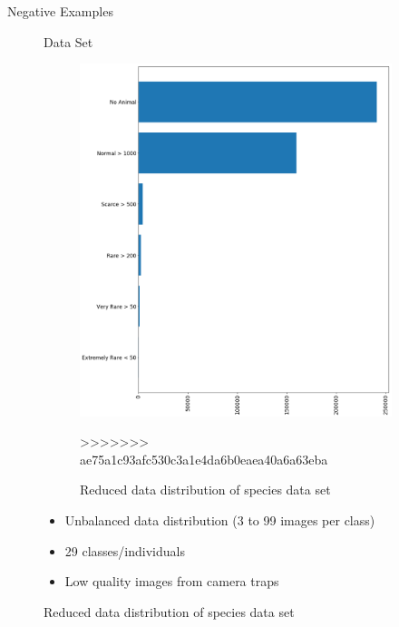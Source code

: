 \documentclass[10pt]{beamer}
\begin{document}
\begin{frame}{Negative Examples}
\begin{figure}
\begin{frame}{Data Set}
\begin{minipage}[c]{0.48\linewidth}
\begin{figure}
			\includegraphics[width=\linewidth,height=.8\textheight,keepaspectratio]{images/Data_dist_sorted_reduced_v2.png}
			\caption{Reduced data distribution of species data set}
>>>>>>> ae75a1c93afc530c3a1e4da6b0eaea40a6a63eba
		\end{figure}
	\end{minipage}
	\hfill
	\begin{minipage}[c]{0.48\linewidth}
		\begin{itemize}
			\item Unbalanced data distribution (3 to 99 images per class)
			\item 29 classes/individuals
			\item Low quality images from camera traps
		\end{itemize}
	\end{minipage}
\end{frame}



\end{figure}
\end{frame}
\end{document}
